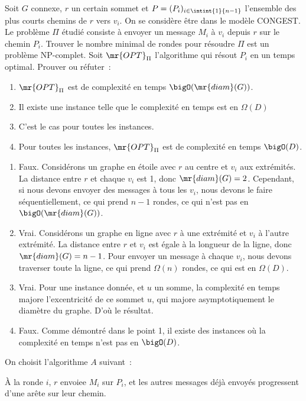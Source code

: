 \begin{exercice}{}{}
Soit $G$ connexe, $r$ un certain sommet et $P = (P_i)_{i \in \intint{1}{n-1}}$ l'ensemble des plus courts chemins de $r$ vers $v_i$. On se considère être dans le modèle CONGEST.
Le problème $\Pi$ étudié consiste à envoyer un message $M_i$ à $v_i$ depuis $r$ sur le chemin $P_i$.
Trouver le nombre minimal de rondes pour résoudre $\Pi$ est un problème NP-complet. Soit $\mr{OPT}_\Pi$ l'algorithme qui résout $P{_i}$ en un temps optimal. Prouver ou réfuter~:
\begin{enumerate}
  \item $\mr{OPT}_\Pi$ est de complexité en temps $\bigO(\mr{diam}(G))$.
  \item Il existe une instance telle que le complexité en temps est en $\Omega(D)$
  \item C'est le cas pour toutes les instances.
  \item Pour toutes les instances, $\mr{OPT}_\Pi$ est de complexité en temps $\bigO(D)$.
\end{enumerate}

\begin{enumerate}
  \item Faux. Considérons un graphe en étoile avec $r$ au centre et $v_i$ aux extrémités. La distance entre $r$ et chaque $v_i$ est 1, donc $\mr{diam}(G) = 2$. Cependant, si nous devons envoyer des messages à tous les $v_i$, nous devons le faire séquentiellement, ce qui prend $n-1$ rondes, ce qui n'est pas en $\bigO(\mr{diam}(G))$.
  
  \item Vrai. Considérons un graphe en ligne avec $r$ à une extrémité et $v_i$ à l'autre extrémité. La distance entre $r$ et $v_i$ est égale à la longueur de la ligne, donc $\mr{diam}(G) = n-1$. Pour envoyer un message à chaque $v_i$, nous devons traverser toute la ligne, ce qui prend $\Omega(n)$ rondes, ce qui est en $\Omega(D)$.
  
  \item Vrai. Pour une instance donnée, et $u$ un somme, la complexité en temps majore l'excentricité de ce sommet $u$, qui majore asymptotiquement le diamètre du graphe. D'où le résultat.
  \item Faux. Comme démontré dans le point 1, il existe des instances où la complexité en temps n'est pas en $\bigO(D)$. 
\end{enumerate}
\end{exercice}

On choisit l'algorithme $A$ suivant~:
\begin{lstLNat}
    À la ronde $i$, $r$ envoiee $M_i$ sur $P_i$,
    et les autres messages déjà envoyés progressent 
    d'une arête sur leur chemin.
\end{lstLNat}

